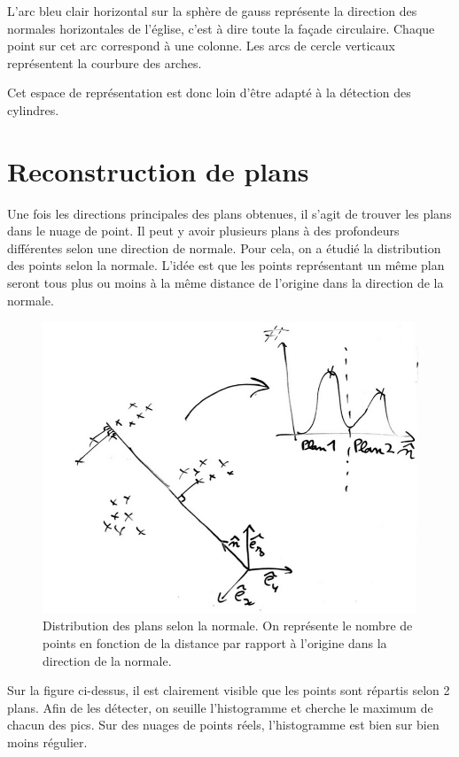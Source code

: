 \documentclass{article}
\begin{document}
L'arc bleu clair horizontal sur la sphère de gauss représente la direction des normales horizontales de l'église, c'est à dire toute la façade circulaire. Chaque point sur cet arc correspond à une colonne. Les arcs de cercle verticaux représentent la courbure des arches.

Cet espace de représentation est donc loin d'être adapté à la détection des cylindres.









\section{Reconstruction de plans}

Une fois les directions principales des plans obtenues, il s'agit de trouver les plans dans le nuage de point. Il peut y avoir plusieurs plans à des profondeurs différentes selon une direction de normale. Pour cela, on a étudié la distribution des points selon la normale. L'idée est que les points représentant un même plan seront tous plus ou moins à la même distance de l'origine dans la direction de la normale.

\begin{figure}[H]
\centering
\includegraphics[width=.7\textwidth]{../normal_to_hist.png}
\caption{Distribution des plans selon la normale. On représente le nombre de points en fonction de la distance par rapport à l'origine dans la direction de la normale.}
\end{figure}


Sur la figure ci-dessus, il est clairement visible que les points sont répartis selon 2 plans. Afin de les détecter, on seuille l'histogramme et cherche le maximum de chacun des pics. Sur des nuages de points réels, l'histogramme est bien sur bien moins régulier.
\end{document}
